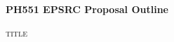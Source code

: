 \documentclass[journal, a4paper]{IEEEtran}
\begin{document}
\begin{comment}
\begin{titlepage}
    \begin{center}
    \rule{0cm}{0pt} \\
    [4cm]
    \noindent\rule{18.2cm}{1pt} \\
    [0.5cm]
    \huge{\bfseries } \\
    [0.2cm]
     \huge{\bfseries PH551 EPSRC Proposal Outline} \\
    [0.1cm]
    \noindent\rule{18.2cm}{1pt} \\
    [2cm]
    \textsc{\large for.....:} \\
    [0.1cm]
    \textsc{\Large this} \\
    [0.1cm]
    \text{\large Due 18/10/2021} \\
    \end{center}
\end{titlepage}
\end{comment}

\onecolumn
\setcounter{page}{1}

\huge{\bfseries PH551 EPSRC Proposal Outline}

\textsc{\Large title}
\end{document}
